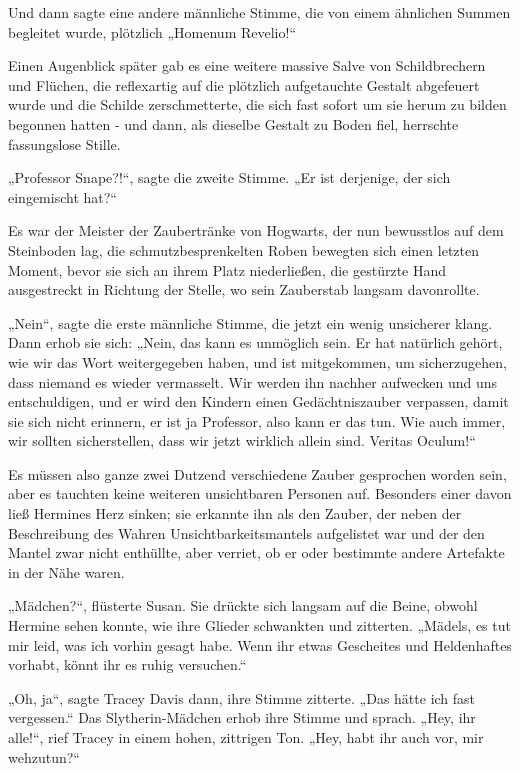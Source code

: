 {Und dann sagte eine andere männliche Stimme, die von einem ähnlichen Summen begleitet wurde, plötzlich „Homenum Revelio!“

Einen Augenblick später gab es eine weitere massive Salve von Schildbrechern und Flüchen, die reflexartig auf die plötzlich aufgetauchte Gestalt abgefeuert wurde und die Schilde zerschmetterte, die sich fast sofort um sie herum zu bilden begonnen hatten - und dann, als dieselbe Gestalt zu Boden fiel, herrschte fassungslose Stille.

„Professor Snape?!“, sagte die zweite Stimme. „Er ist derjenige, der sich eingemischt hat?“

Es war der Meister der Zaubertränke von Hogwarts, der nun bewusstlos auf dem Steinboden lag, die schmutzbesprenkelten Roben bewegten sich einen letzten Moment, bevor sie sich an ihrem Platz niederließen, die gestürzte Hand ausgestreckt in Richtung der Stelle, wo sein Zauberstab langsam davonrollte.

„Nein“, sagte die erste männliche Stimme, die jetzt ein wenig unsicherer klang. Dann erhob sie sich: „Nein, das kann es unmöglich sein. Er hat natürlich gehört, wie wir das Wort weitergegeben haben, und ist mitgekommen, um sicherzugehen, dass niemand es wieder vermasselt. Wir werden ihn nachher aufwecken und uns entschuldigen, und er wird den Kindern einen Gedächtniszauber verpassen, damit sie sich nicht erinnern, er ist ja Professor, also kann er das tun. Wie auch immer, wir sollten sicherstellen, dass wir jetzt wirklich allein sind. Veritas Oculum!“

Es müssen also ganze zwei Dutzend verschiedene Zauber gesprochen worden sein, aber es tauchten keine weiteren unsichtbaren Personen auf. Besonders einer davon ließ Hermines Herz sinken; sie erkannte ihn als den Zauber, der neben der Beschreibung des Wahren Unsichtbarkeitsmantels aufgelistet war und der den Mantel zwar nicht enthüllte, aber verriet, ob er oder bestimmte andere Artefakte in der Nähe waren.

„Mädchen?“, flüsterte Susan. Sie drückte sich langsam auf die Beine, obwohl Hermine sehen konnte, wie ihre Glieder schwankten und zitterten. „Mädels, es tut mir leid, was ich vorhin gesagt habe. Wenn ihr etwas Gescheites und Heldenhaftes vorhabt, könnt ihr es ruhig versuchen.“

„Oh, ja“, sagte Tracey Davis dann, ihre Stimme zitterte. „Das hätte ich fast vergessen.“ Das Slytherin-Mädchen erhob ihre Stimme und sprach. „Hey, ihr alle!“, rief Tracey in einem hohen, zittrigen Ton. „Hey, habt ihr auch vor, mir wehzutun?“

}
